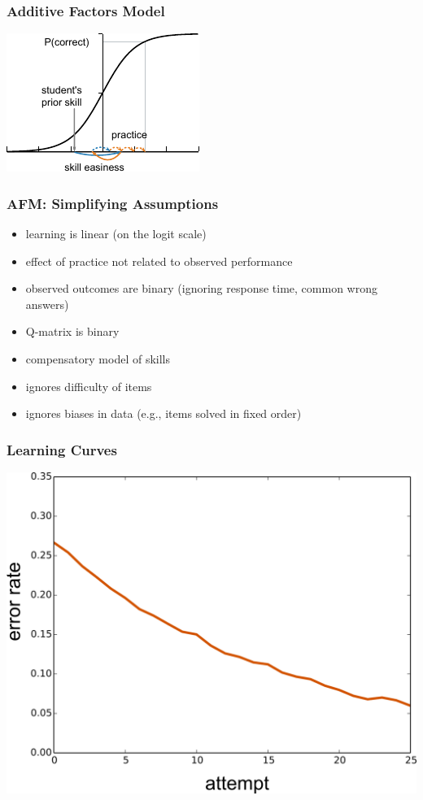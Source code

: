 \documentclass[bigger]{beamer}
\begin{document}
\begin{frame}
  \frametitle{Additive Factors Model}

  \begin{center}
    \includegraphics[width=.8\linewidth]{afm-illustration}
  \end{center}
\end{frame}

\begin{frame}
  \frametitle{AFM: Simplifying Assumptions}

  \begin{itemize}
  \item learning is linear (on the logit scale)
  \item effect of practice not related to observed performance
  \item observed outcomes are binary (ignoring response time, common wrong
    answers)
  \item Q-matrix is binary
  \item compensatory model of skills
  \item ignores difficulty of items
  \item ignores biases in data (e.g., items solved in fixed order)
  \end{itemize}
\end{frame}

\begin{frame}
  \frametitle{Learning Curves}

  \begin{center}
    \includegraphics[width=.8\linewidth]{learn-curve-simple}
  \end{center}
\end{frame}
\end{document}
